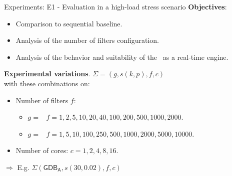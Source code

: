 \begin{frame}{Experiments: E1 - Evaluation in a high-load stress scenario}
\textbf{Objectives}:
\begin{itemize}
    \item Comparison to sequential baseline.
    \item Analysis of the number of filters configuration.
    \item Analysis of the behavior and suitability of the \DPATM\ as a real-time engine.
\end{itemize}
\vspace{0.5em}
\textbf{Experimental variations}. $\Sigma= (g, s(k, p), f, c)$\\
with these combinations on:
\vspace{0.3em}
\begin{itemize}
    \item Number of filters $f$:
    \begin{itemize}
        \item $g = $ \smallG\ $f=1,2,5,10,20,40,100,200,500,1000,2000$.
        \item $g = $ \mediumG\ $f=1,5,10,100,250,500,1000,2000,5000,10000$.
    \end{itemize} 
    \item Number of cores: $c = 1, 2, 4, 8, 16$.
\end{itemize}
\vspace{0.7em}
$\Rightarrow$ {\small E.g. $\Sigma(\mathsf{GDB_A}, s(30, 0.02), f, c)$}
\end{frame}

